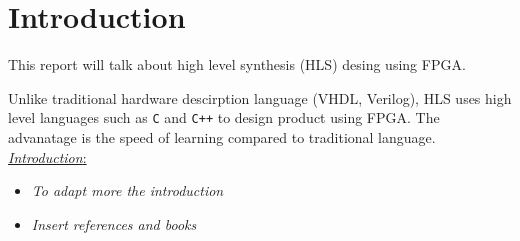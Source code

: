 


\chapter{Introduction}


This report will talk about high level synthesis (HLS) desing using FPGA. 

Unlike traditional hardware descirption language (VHDL, Verilog), HLS uses high level languages such as \verb|C| and \verb|C++| to design product using FPGA. The advanatage is the speed of learning compared to traditional language.\\


 \underline{\textit{Introduction}:}

\begin{itemize}

\item \textit{To adapt more the introduction}

\item \textit{Insert references and books}

\end{itemize} 



